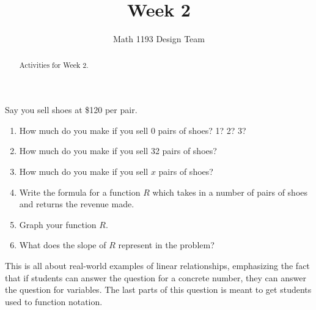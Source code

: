 \documentclass[noauthor,noinstructornotes]{ximera}
\title{Week 2}
\author{Math 1193 Design Team}
\begin{document}
\begin{abstract}
    Activities for Week 2.
\end{abstract}
\maketitle

\begin{problem}
Say you sell shoes at \$120 per pair.

\begin{enumerate}
    \item How much do you 
    make if you sell 0 pairs of shoes? 1? 2? 3? 
    \item How much do you 
    make if you sell 32 pairs of shoes?
    \item How much do you make if you sell \(x\)
    pairs of shoes?
    \item Write the formula for a function \(R\)
    which takes in a number of pairs of shoes and
    returns the revenue made.
    \item Graph your function \(R\).
    \item What does the slope of \(R\) represent
    in the problem?
\end{enumerate}

\begin{instructorNotes}
This is all about real-world examples of linear relationships,
emphasizing the fact that if students can answer the question 
for a concrete number, they can answer the question for 
variables. The last parts of this question is meant to 
get students used to function notation. 
\end{instructorNotes}

\end{problem}
\end{document}
